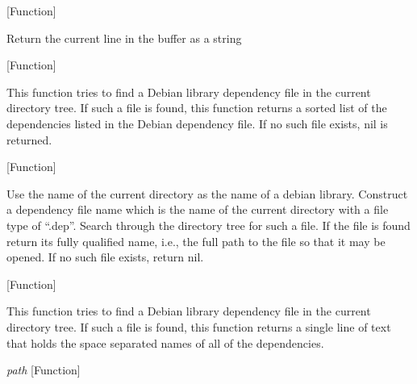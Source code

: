 \vspace{1em}
\noindent
{}
\usebox{\funcname}
 \hfill [Function]

\begin{doc-string}
Return the current line in the buffer as a string
\end{doc-string}

\vspace{1em}
\noindent
{}
\usebox{\funcname}
 \hfill [Function]

\begin{doc-string}
This function tries to find a Debian library dependency file in the current
directory tree.  If such a file is found, this function returns a sorted list of
the dependencies listed in the Debian dependency file.  If no such file exists,
nil is returned.
\end{doc-string}

\vspace{1em}
\noindent
{}
\usebox{\funcname}
 \hfill [Function]

\begin{doc-string}
Use the name of the current directory as the name of a debian library.
Construct a dependency file name which is the name of the current directory with
a file type of ``.dep''.  Search through the directory tree for such a file.  If
the file is found return its fully qualified name, i.e., the full path to the
file so that it may be opened.  If no such file exists, return nil.
\end{doc-string}

\vspace{1em}
\noindent
{}
\usebox{\funcname}
 \hfill [Function]

\begin{doc-string}
This function tries to find a Debian library dependency file in the current
directory tree.  If such a file is found, this function returns a single line of
text that holds the space separated names of all of the dependencies.
\end{doc-string}

\vspace{1em}
\noindent
{}
\usebox{\funcname}\emph{path}
 \hfill [Function]

